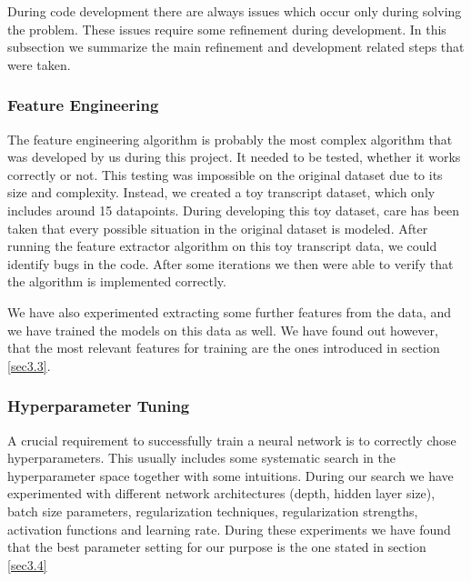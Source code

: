 During code development there are always issues which occur only during solving the problem. These issues require some refinement during development. In this subsection we summarize the main refinement and development related steps that were taken.

\subsubsection{Feature Engineering}
The feature engineering algorithm is probably the most complex algorithm that was developed by us during this project. It needed to be tested, whether it works correctly or not. This testing was impossible on the original dataset due to its size and complexity. Instead, we created a toy transcript dataset, which only includes around 15 datapoints. During developing this toy dataset, care has been taken that every possible situation in the original dataset is modeled. After running the feature extractor algorithm on this toy transcript data, we could identify bugs in the code. After some iterations we then were able to verify that the algorithm is implemented correctly.

We have also experimented extracting some further features from the data, and we have trained the models on this data as well. We have found out however, that the most relevant features for training are the ones introduced in section \ref{sec3.3}.

\subsubsection{Hyperparameter Tuning}

A crucial requirement to successfully train a neural network is to correctly chose hyperparameters. This usually includes some systematic search in the hyperparameter space together with some intuitions. During our search we have experimented with different network architectures (depth, hidden layer size), batch size parameters, regularization techniques, regularization strengths, activation functions and learning rate. During these experiments we have found that the best parameter setting for our purpose is the one stated in section \ref{sec3.4}

